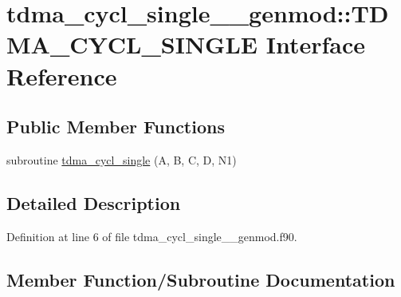 \hypertarget{interfacetdma__cycl__single____genmod_1_1_t_d_m_a___c_y_c_l___s_i_n_g_l_e}{}\section{tdma\+\_\+cycl\+\_\+single\+\_\+\+\_\+genmod\+::T\+D\+M\+A\+\_\+\+C\+Y\+C\+L\+\_\+\+S\+I\+N\+G\+LE Interface Reference}
\label{interfacetdma__cycl__single____genmod_1_1_t_d_m_a___c_y_c_l___s_i_n_g_l_e}
\subsection*{Public Member Functions}
\begin{DoxyCompactItemize}
\item 
subroutine \mbox{\hyperlink{interfacetdma__cycl__single____genmod_1_1_t_d_m_a___c_y_c_l___s_i_n_g_l_e_ac1deec6e3525f28134923212cec6d3bc}{tdma\+\_\+cycl\+\_\+single}} (A, B, C, D, N1)
\end{DoxyCompactItemize}


\subsection{Detailed Description}


Definition at line 6 of file tdma\+\_\+cycl\+\_\+single\+\_\+\+\_\+genmod.\+f90.



\subsection{Member Function/\+Subroutine Documentation}
\mbox{\label{interfacetdma__cycl__single____genmod_1_1_t_d_m_a___c_y_c_l___s_i_n_g_l_e_ac1deec6e3525f28134923212cec6d3bc}} 
